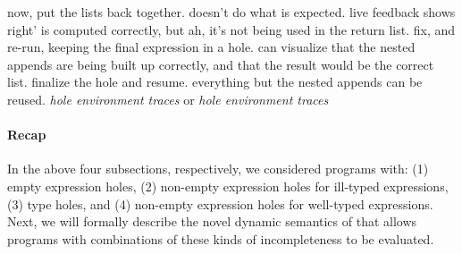 now, put the lists back together.
%
doesn't do what is expected.
%
live feedback shows right' is computed correctly, but ah, it's not being used
in the return list.
%
fix, and re-run, keeping the final expression in a hole.
%
can visualize that the nested appends are being built up correctly, and that the
result would be the correct list.
%
finalize the hole and resume. everything but the nested appends can be reused.
%
\emph{hole environment traces} or \emph{hole environment traces}

\paragraph{Recap}
%
In the above four subsections, respectively, we considered programs with:
%
(1) empty expression holes,
%
(2) non-empty expression holes for ill-typed expressions,
%
(3) type holes, and
%
(4) non-empty expression holes for well-typed expressions.
%
Next, we will formally describe the novel dynamic semantics of \HazelnutLive{}
that allows programs with combinations of these kinds of incompleteness to be
evaluated.
